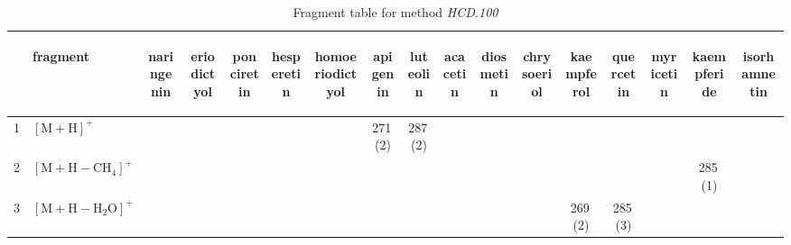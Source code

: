\documentclass[]{article}
\begin{document}
\begin{table}\caption{Fragment table for method \textit{HCD.100}}{\scriptsize
\begin{tabular}{ll|ccccc|ccccc|ccccc}
  \toprule
 & \begin{sideways} fragment \end{sideways} & \begin{sideways} naringenin \end{sideways} & \begin{sideways} eriodictyol \end{sideways} & \begin{sideways} ponciretin \end{sideways} & \begin{sideways} hesperetin \end{sideways} & \begin{sideways} homoeriodictyol \end{sideways} & \begin{sideways} apigenin \end{sideways} & \begin{sideways} luteolin \end{sideways} & \begin{sideways} acacetin \end{sideways} & \begin{sideways} diosmetin \end{sideways} & \begin{sideways} chrysoeriol \end{sideways} & \begin{sideways} kaempferol \end{sideways} & \begin{sideways} quercetin \end{sideways} & \begin{sideways} myricetin \end{sideways} & \begin{sideways} kaempferide \end{sideways} & \begin{sideways} isorhamnetin \end{sideways} \\ 
  \midrule
1 & $\mathrm{[M{+}H]^+}$ &  &  &  &  &  & 271\,(2) & 287\,(2) &  &  &  &  &  &  &  &  \\ 
  2 & $\mathrm{[M{+}H{-}CH_{4}]^+}$ &  &  &  &  &  &  &  &  &  &  &  &  &  & 285\,(1) &  \\ 
  3 & $\mathrm{[M{+}H{-}H_{2}O]^+}$ &  &  &  &  &  &  &  &  &  &  & 269\,(2) & 285\,(3) &  &  &  \\ 

\end{tabular}}
\end{table}
\end{document}
